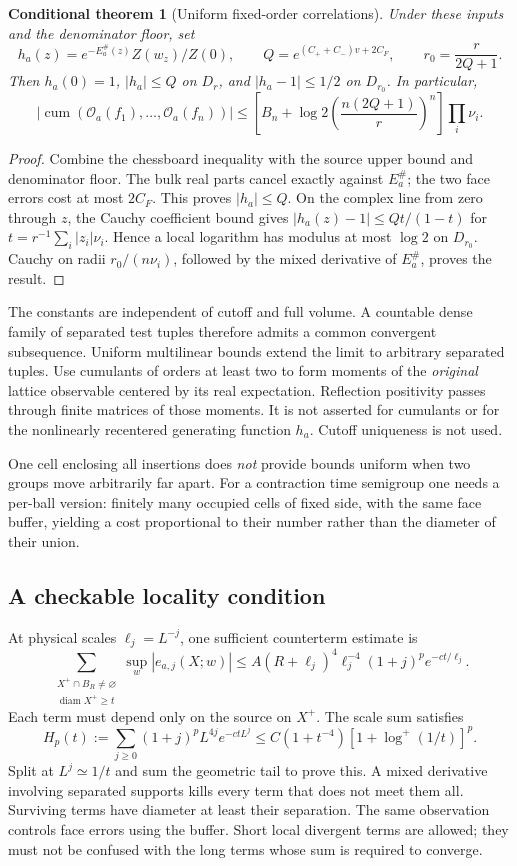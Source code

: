 \documentclass[11pt]{article}
\newtheorem{theorem}[proposition]{Conditional theorem}
\theoremstyle{remark}
\newcommand{\cum}{\operatorname{cum}}
\newcommand{\abs}[1]{\left|#1\right|}
\begin{document}
\begin{theorem}[Uniform fixed-order correlations]
Under these inputs and the denominator floor, set
\[
h_a(z)=e^{-E_a^\#(z)}Z(w_z)/Z(0),\qquad
Q=e^{(C_++C_-)v+2C_F},\qquad r_0=\frac{r}{2Q+1}.
\]
Then $h_a(0)=1$, $|h_a|\leq Q$ on $D_r$, and $|h_a-1|\leq1/2$ on $D_{r_0}$.
In particular,
\[
 \abs{\cum(\mathcal O_a(f_1),\ldots,\mathcal O_a(f_n))}
 \leq
 \left[B_n+\log2
 \left(\frac{n(2Q+1)}{r}\right)^n\right]\prod_i\nu_i.
\]
\end{theorem}
\begin{proof}
Combine the chessboard inequality with the source upper bound and
denominator floor. The bulk real parts cancel exactly against $E_a^\#$;
the two face errors cost at most $2C_F$. This proves $|h_a|\leq Q$.
On the complex line from zero through $z$, the Cauchy coefficient bound
gives $|h_a(z)-1|\leq Qt/(1-t)$ for
$t=r^{-1}\sum_i|z_i|\nu_i$. Hence a local logarithm has modulus at most
$\log2$ on $D_{r_0}$. Cauchy on radii $r_0/(n\nu_i)$, followed by the
mixed derivative of $E_a^\#$, proves the result.
\end{proof}

The constants are independent of cutoff and full volume. A countable dense
family of separated test tuples therefore admits a common convergent
subsequence. Uniform multilinear bounds extend the limit to arbitrary
separated tuples. Use cumulants of orders at least two to form moments
of the \emph{original} lattice observable centered by its real
expectation. Reflection positivity passes through finite matrices of
those moments. It is not asserted for cumulants or for the
nonlinearly recentered generating function $h_a$.
Cutoff uniqueness is not used.

One cell enclosing all insertions does \emph{not} provide bounds uniform
when two groups move arbitrarily far apart. For a contraction time
semigroup one needs a per-ball version: finitely many occupied cells of
fixed side, with the same face buffer, yielding a cost proportional to
their number rather than the diameter of their union.

\subsection{A checkable locality condition}

At physical scales $\ell_j=L^{-j}$, one sufficient counterterm estimate is
\[
\sum_{\substack{X^+\cap B_R\ne\varnothing\\ \operatorname{diam}X^+\geq t}}
 \sup_w |e_{a,j}(X;w)|
\leq A(R+\ell_j)^4\ell_j^{-4}(1+j)^p e^{-ct/\ell_j}.
\tag{2.1}
\]
Each term must depend only on the source on $X^+$.
The scale sum satisfies
\[
H_p(t):=\sum_{j\geq0}(1+j)^p L^{4j}e^{-ctL^j}
\leq C(1+t^{-4})[1+\log^+(1/t)]^p.
\]
Split at $L^j\simeq1/t$ and sum the geometric tail to prove this.
A mixed derivative involving separated supports kills every term that
does not meet them all. Surviving terms have diameter at least their
separation. The same observation controls face errors using the buffer.
Short local divergent terms are allowed; they must not be confused with
the long terms whose sum is required to converge.
\end{document}
